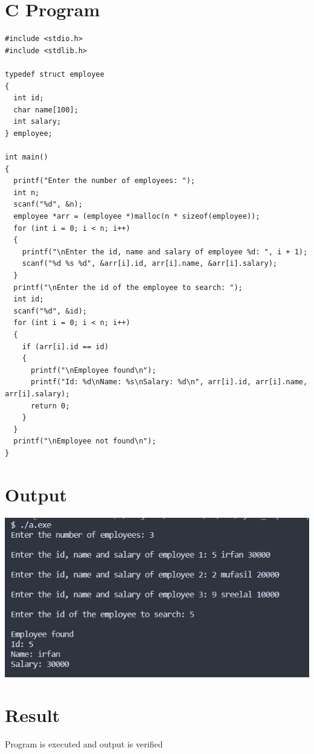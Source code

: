 \section{C Program}
\begin{lstlisting}[label={list:c_program:employee_search}]
#include <stdio.h>
#include <stdlib.h>

typedef struct employee
{
  int id;
  char name[100];
  int salary;
} employee;

int main()
{
  printf("Enter the number of employees: ");
  int n;
  scanf("%d", &n);
  employee *arr = (employee *)malloc(n * sizeof(employee));
  for (int i = 0; i < n; i++)
  {
    printf("\nEnter the id, name and salary of employee %d: ", i + 1);
    scanf("%d %s %d", &arr[i].id, arr[i].name, &arr[i].salary);
  }
  printf("\nEnter the id of the employee to search: ");
  int id;
  scanf("%d", &id);
  for (int i = 0; i < n; i++)
  {
    if (arr[i].id == id)
    {
      printf("\nEmployee found\n");
      printf("Id: %d\nName: %s\nSalary: %d\n", arr[i].id, arr[i].name, arr[i].salary);
      return 0;
    }
  }
  printf("\nEmployee not found\n");
}
\end{lstlisting}

\section{Output}
\includegraphics[]{Cycle_1/Outputs/LinearSearch.png}

\section{Result}
Program is executed and output is verified
